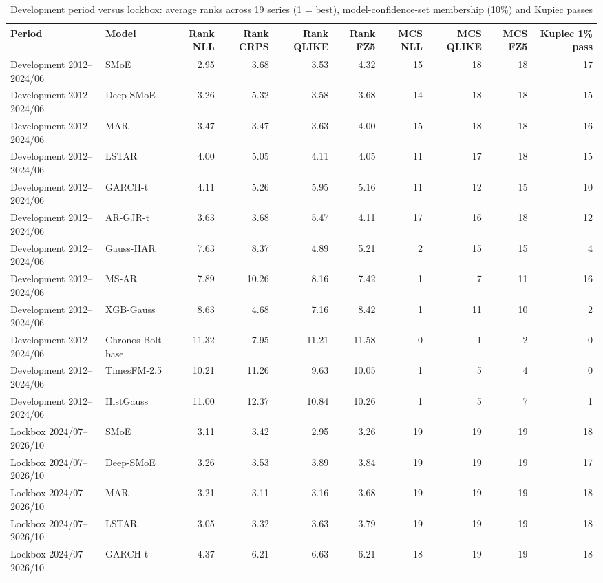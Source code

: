 \begin{table}[!htbp]\centering\scriptsize
\caption{Development period versus lockbox: average ranks across 19 series (1 = best), model-confidence-set membership (10\%) and Kupiec passes}\label{tab:lockbox}
\begin{adjustbox}{max width=\textwidth}
\begin{tabular}{llrrrrrrrr}
\toprule
Period & Model & Rank NLL & Rank CRPS & Rank QLIKE & Rank FZ5 & MCS NLL & MCS QLIKE & MCS FZ5 & Kupiec 1\% pass\\
\midrule
Development 2012--2024/06 & SMoE & 2.95 & 3.68 & 3.53 & 4.32 & 15 & 18 & 18 & 17\\
Development 2012--2024/06 & Deep-SMoE & 3.26 & 5.32 & 3.58 & 3.68 & 14 & 18 & 18 & 15\\
Development 2012--2024/06 & MAR & 3.47 & 3.47 & 3.63 & 4.00 & 15 & 18 & 18 & 16\\
Development 2012--2024/06 & LSTAR & 4.00 & 5.05 & 4.11 & 4.05 & 11 & 17 & 18 & 15\\
Development 2012--2024/06 & GARCH-t & 4.11 & 5.26 & 5.95 & 5.16 & 11 & 12 & 15 & 10\\
Development 2012--2024/06 & AR-GJR-t & 3.63 & 3.68 & 5.47 & 4.11 & 17 & 16 & 18 & 12\\
Development 2012--2024/06 & Gauss-HAR & 7.63 & 8.37 & 4.89 & 5.21 & 2 & 15 & 15 & 4\\
Development 2012--2024/06 & MS-AR & 7.89 & 10.26 & 8.16 & 7.42 & 1 & 7 & 11 & 16\\
Development 2012--2024/06 & XGB-Gauss & 8.63 & 4.68 & 7.16 & 8.42 & 1 & 11 & 10 & 2\\
Development 2012--2024/06 & Chronos-Bolt-base & 11.32 & 7.95 & 11.21 & 11.58 & 0 & 1 & 2 & 0\\
Development 2012--2024/06 & TimesFM-2.5 & 10.21 & 11.26 & 9.63 & 10.05 & 1 & 5 & 4 & 0\\
Development 2012--2024/06 & HistGauss & 11.00 & 12.37 & 10.84 & 10.26 & 1 & 5 & 7 & 1\\
Lockbox 2024/07--2026/10 & SMoE & 3.11 & 3.42 & 2.95 & 3.26 & 19 & 19 & 19 & 18\\
Lockbox 2024/07--2026/10 & Deep-SMoE & 3.26 & 3.53 & 3.89 & 3.84 & 19 & 19 & 19 & 17\\
Lockbox 2024/07--2026/10 & MAR & 3.21 & 3.11 & 3.16 & 3.68 & 19 & 19 & 19 & 18\\
Lockbox 2024/07--2026/10 & LSTAR & 3.05 & 3.32 & 3.63 & 3.79 & 19 & 19 & 19 & 18\\
Lockbox 2024/07--2026/10 & GARCH-t & 4.37 & 6.21 & 6.63 & 6.21 & 18 & 19 & 19 & 18\\

\end{tabular}
\end{adjustbox}
\end{table}
